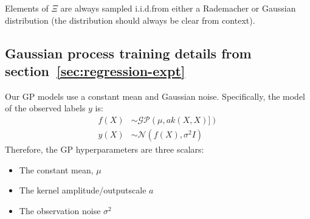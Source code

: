 Elements of $\Xi$ are always sampled i.i.d.\@ from either a Rademacher or Gaussian distribution
(the distribution should always be clear from context).



\subsection{Gaussian process training details from section~\ref{sec:regression-expt}}\label{apdx:regression-expt-details}

Our GP models use a constant mean and Gaussian noise.
Specifically, the model of the observed labels $y$ is:
\begin{align*}
    f(X) &\sim \mathcal{GP}\left(\mu, ak(X,X)]\right) \\
    y(X) &\sim \mathcal{N}\left(f(X), \sigma^2I\right)
\end{align*}
Therefore, the GP hyperparameters are three scalars:
\begin{itemize}
    \item The constant mean, $\mu$
    \item The kernel amplitude/outputscale $a$
    \item The observation noise $\sigma^2$
\end{itemize}

